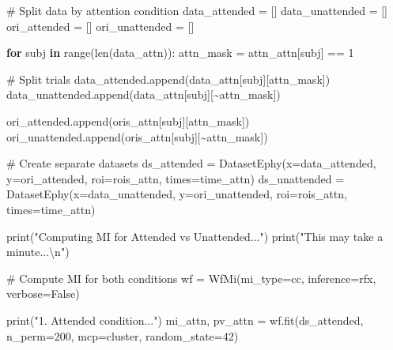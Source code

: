 \documentclass[
  11pt,
  letterpaper,
  oneside,
  openany]{book}
\newenvironment{Shaded}{\begin{snugshade}}{\end{snugshade}}
\newcommand{\BuiltInTok}[1]{\textcolor[rgb]{0.00,0.23,0.31}{#1}}
\newcommand{\CharTok}[1]{\textcolor[rgb]{0.13,0.47,0.30}{#1}}
\newcommand{\CommentTok}[1]{\textcolor[rgb]{0.37,0.37,0.37}{#1}}
\newcommand{\ControlFlowTok}[1]{\textcolor[rgb]{0.00,0.23,0.31}{\textbf{#1}}}
\newcommand{\DecValTok}[1]{\textcolor[rgb]{0.68,0.00,0.00}{#1}}
\newcommand{\KeywordTok}[1]{\textcolor[rgb]{0.00,0.23,0.31}{\textbf{#1}}}
\newcommand{\NormalTok}[1]{\textcolor[rgb]{0.00,0.23,0.31}{#1}}
\newcommand{\OperatorTok}[1]{\textcolor[rgb]{0.37,0.37,0.37}{#1}}
\newcommand{\StringTok}[1]{\textcolor[rgb]{0.13,0.47,0.30}{#1}}
\newcommand{\VariableTok}[1]{\textcolor[rgb]{0.07,0.07,0.07}{#1}}
\begin{document}
\begin{Shaded}
\begin{Highlighting}[]
\CommentTok{\# Split data by attention condition}
\NormalTok{data\_attended }\OperatorTok{=}\NormalTok{ []}
\NormalTok{data\_unattended }\OperatorTok{=}\NormalTok{ []}
\NormalTok{ori\_attended }\OperatorTok{=}\NormalTok{ []}
\NormalTok{ori\_unattended }\OperatorTok{=}\NormalTok{ []}

\ControlFlowTok{for}\NormalTok{ subj }\KeywordTok{in} \BuiltInTok{range}\NormalTok{(}\BuiltInTok{len}\NormalTok{(data\_attn)):}
\NormalTok{    attn\_mask }\OperatorTok{=}\NormalTok{ attn\_attn[subj] }\OperatorTok{==} \DecValTok{1}
    
    \CommentTok{\# Split trials}
\NormalTok{    data\_attended.append(data\_attn[subj][attn\_mask])}
\NormalTok{    data\_unattended.append(data\_attn[subj][}\OperatorTok{\textasciitilde{}}\NormalTok{attn\_mask])}
    
\NormalTok{    ori\_attended.append(oris\_attn[subj][attn\_mask])}
\NormalTok{    ori\_unattended.append(oris\_attn[subj][}\OperatorTok{\textasciitilde{}}\NormalTok{attn\_mask])}

\CommentTok{\# Create separate datasets}
\NormalTok{ds\_attended }\OperatorTok{=}\NormalTok{ DatasetEphy(x}\OperatorTok{=}\NormalTok{data\_attended, y}\OperatorTok{=}\NormalTok{ori\_attended, roi}\OperatorTok{=}\NormalTok{rois\_attn, times}\OperatorTok{=}\NormalTok{time\_attn)}
\NormalTok{ds\_unattended }\OperatorTok{=}\NormalTok{ DatasetEphy(x}\OperatorTok{=}\NormalTok{data\_unattended, y}\OperatorTok{=}\NormalTok{ori\_unattended, roi}\OperatorTok{=}\NormalTok{rois\_attn, times}\OperatorTok{=}\NormalTok{time\_attn)}

\BuiltInTok{print}\NormalTok{(}\StringTok{"Computing MI for Attended vs Unattended..."}\NormalTok{)}
\BuiltInTok{print}\NormalTok{(}\StringTok{"This may take a minute...}\CharTok{\textbackslash{}n}\StringTok{"}\NormalTok{)}

\CommentTok{\# Compute MI for both conditions}
\NormalTok{wf }\OperatorTok{=}\NormalTok{ WfMi(mi\_type}\OperatorTok{=}\StringTok{\textquotesingle{}cc\textquotesingle{}}\NormalTok{, inference}\OperatorTok{=}\StringTok{\textquotesingle{}rfx\textquotesingle{}}\NormalTok{, verbose}\OperatorTok{=}\VariableTok{False}\NormalTok{)}

\BuiltInTok{print}\NormalTok{(}\StringTok{"1. Attended condition..."}\NormalTok{)}
\NormalTok{mi\_attn, pv\_attn }\OperatorTok{=}\NormalTok{ wf.fit(ds\_attended, n\_perm}\OperatorTok{=}\DecValTok{200}\NormalTok{, mcp}\OperatorTok{=}\StringTok{\textquotesingle{}cluster\textquotesingle{}}\NormalTok{, random\_state}\OperatorTok{=}\DecValTok{42}\NormalTok{)}


\end{Highlighting}
\end{Shaded}
\end{document}
